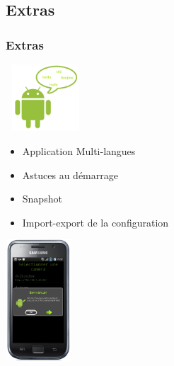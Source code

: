 \subsection{Extras}
\begin{frame}
\frametitle{Extras}
\includegraphics[width=3cm, height=2.5cm]{Images/ImageSlide11-3.png}\\
\begin{minipage}{0.69\textwidth}
\begin{itemize}
  \item Application Multi-langues
  \item Astuces au démarrage
  \item Snapshot
\item Import-export de la configuration
\end{itemize}
\end{minipage}
\begin{minipage}{0.29\textwidth}
\includegraphics[width=2.5cm, height=4.5cm]{Images/ImageSlide11-3a.png}
\end{minipage}
\end{frame}